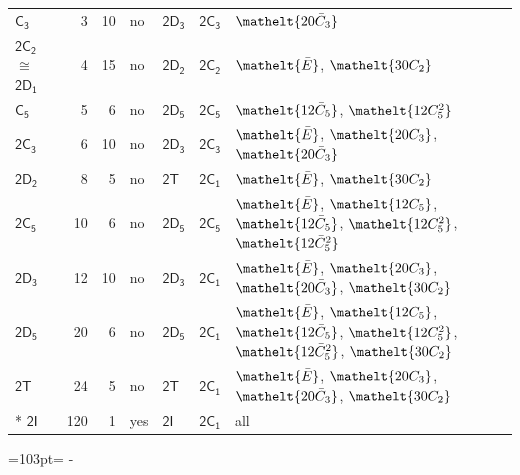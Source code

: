 \documentclass[10pt,a4paper]{article}
\newcommand{\needspace}[1]{\par\penalty-100\begingroup\dimen0=#1\relax\dimen2=\pagegoal
  \advance\dimen2-\pagetotal\ifdim\dimen0>\dimen2\relax\ifdim\dimen2>0pt\vfil\break\fi\fi
  \endgroup}
\numberwithin{equation}{section}
\newcommand{\eltfont}[1]{{\let\sigma\eltsigma\mathelt{#1}}}
\newcommand{\grp}[1]{\mathsf{#1}}
\newcommand{\cls}[1]{\eltfont{#1}}
\newcommand{\samecls}{\cong}
\newcommand{\barred}[1]{\bar{#1}}
\newlength{\fillwidth}\newlength{\cellwidth}\newlength{\colwidth}
\begin{document}
{\begin{longtable}{@{}lrrlll>{\RaggedRight\arraybackslash}p{\fillwidth}@{}}
\href{C3.pdf}{$\grp{C_{3}}$} & 3 & 10 & no & \href{2D3.pdf}{$\grp{2D_{3}}$} & \href{2C3.pdf}{$\grp{2C_{3}}$} & $\cls{20\barred{C}_{3}}$\\
\href{2C2.pdf}{$\grp{2C_{2}}$} $\samecls$ \href{2D1.pdf}{$\grp{2D_{1}}$} & 4 & 15 & no & \href{2D2.pdf}{$\grp{2D_{2}}$} & \href{2C2.pdf}{$\grp{2C_{2}}$} & $\cls{\barred{E}}$, $\cls{30C_{2}}$\\
\href{C5.pdf}{$\grp{C_{5}}$} & 5 & 6 & no & \href{2D5.pdf}{$\grp{2D_{5}}$} & \href{2C5.pdf}{$\grp{2C_{5}}$} & $\cls{12\barred{C}_{5}}$, $\cls{12C_{5}^{2}}$\\
\href{2C3.pdf}{$\grp{2C_{3}}$} & 6 & 10 & no & \href{2D3.pdf}{$\grp{2D_{3}}$} & \href{2C3.pdf}{$\grp{2C_{3}}$} & $\cls{\barred{E}}$, $\cls{20C_{3}}$, $\cls{20\barred{C}_{3}}$\\
\href{2D2.pdf}{$\grp{2D_{2}}$} & 8 & 5 & no & \href{2T.pdf}{$\grp{2T}$} & \href{2C1.pdf}{$\grp{2C_{1}}$} & $\cls{\barred{E}}$, $\cls{30C_{2}}$\\
\href{2C5.pdf}{$\grp{2C_{5}}$} & 10 & 6 & no & \href{2D5.pdf}{$\grp{2D_{5}}$} & \href{2C5.pdf}{$\grp{2C_{5}}$} & $\cls{\barred{E}}$, $\cls{12C_{5}}$, $\cls{12\barred{C}_{5}}$, $\cls{12C_{5}^{2}}$, $\cls{12\barred{C}_{5}^{2}}$\\
\href{2D3.pdf}{$\grp{2D_{3}}$} & 12 & 10 & no & \href{2D3.pdf}{$\grp{2D_{3}}$} & \href{2C1.pdf}{$\grp{2C_{1}}$} & $\cls{\barred{E}}$, $\cls{20C_{3}}$, $\cls{20\barred{C}_{3}}$, $\cls{30C_{2}}$\\
\href{2D5.pdf}{$\grp{2D_{5}}$} & 20 & 6 & no & \href{2D5.pdf}{$\grp{2D_{5}}$} & \href{2C1.pdf}{$\grp{2C_{1}}$} & $\cls{\barred{E}}$, $\cls{12C_{5}}$, $\cls{12\barred{C}_{5}}$, $\cls{12C_{5}^{2}}$, $\cls{12\barred{C}_{5}^{2}}$, $\cls{30C_{2}}$\\
\href{2T.pdf}{$\grp{2T}$} & 24 & 5 & no & \href{2T.pdf}{$\grp{2T}$} & \href{2C1.pdf}{$\grp{2C_{1}}$} & $\cls{\barred{E}}$, $\cls{20C_{3}}$, $\cls{20\barred{C}_{3}}$, $\cls{30C_{2}}$\\*
\href{2I.pdf}{$\grp{2I}$} & 120 & 1 & yes & \href{2I.pdf}{$\grp{2I}$} & \href{2C1.pdf}{$\grp{2C_{1}}$} & all\\
\bottomrule\end{longtable}}
\needspace{103pt}
\end{document}
